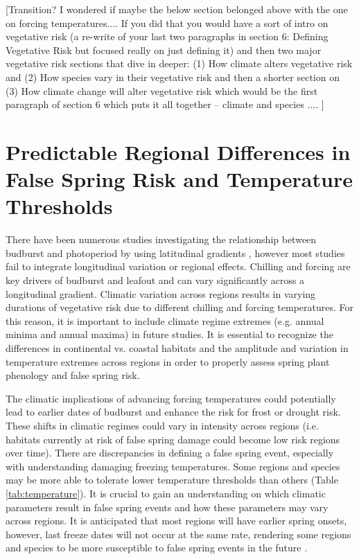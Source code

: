 \documentclass{article}\usepackage[]{graphicx}\usepackage[]{color}
\begin{document}
[Transition? I wondered if maybe the below section belonged above with the one on forcing temperatures.... If you did that you would have a sort of intro on vegetative risk (a re-write of your last two paragraphs in section 6: Defining Vegetative Risk but focused really on just defining it) and then two major vegetative risk sections that dive in deeper: (1) How climate alters vegetative risk and (2) How species vary in their vegetative risk and then a shorter section on (3) How climate change will alter vegetative risk which would be the first paragraph of section 6 which puts it all together -- climate and species .... ]

\section {Predictable Regional Differences in False Spring Risk and Temperature Thresholds}
There have been numerous studies investigating the relationship between budburst and photoperiod by using latitudinal gradients \citep{Partanen2004, Viheraaarnio2006, Caffarra2011, Zohner2016, Gauzere2017}, however most studies fail to integrate longitudinal variation or regional effects. Chilling and forcing are key drivers of budburst and leafout and can vary significantly across a longitudinal gradient. Climatic variation across regions results in varying durations of vegetative risk due to different chilling and forcing temperatures. For this reason, it is important to include climate regime extremes (e.g. annual minima and annual maxima) in future studies. It is essential to recognize the differences in continental vs. coastal habitats and the amplitude and variation in temperature extremes across regions in order to properly assess spring plant phenology and false spring risk. 

The climatic implications of advancing forcing temperatures could potentially lead to earlier dates of budburst and enhance the risk for frost or drought risk. These shifts in climatic regimes could vary in intensity across regions (i.e. habitats currently at risk of false spring damage could become low risk regions over time). There are discrepancies in defining a false spring event, especially with understanding damaging freezing temperatures. Some regions and species may be more able to tolerate lower temperature thresholds than others (Table \ref{tab:temperature}). It is crucial to gain an understanding on which climatic parameters result in false spring events and how these parameters may vary across regions. It is anticipated that most regions will have earlier spring onsets, however, last freeze dates will not occur at the same rate, rendering some regions and species to be more susceptible to false spring events in the future \citep{Labe2016}. 
\end{document}

